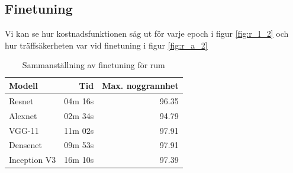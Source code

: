 \documentclass[]{kththesis}
\begin{document}
\subsection{Finetuning}
Vi kan se hur kostnadsfunktionen såg ut för varje epoch i figur \ref{fig:r_l_2} och hur träffsäkerheten var vid finetuning i figur \ref{fig:r_a_2}

\begin{table}
  \centering
  \begin{tabular}{|l|r|r|}
    Modell & Tid & Max. noggrannhet \\ 
    \hline
    Resnet       & 04m 16s & 96.35 \\
    Alexnet      & 02m 34s & 94.79 \\
    VGG-11       & 11m 02s & 97.91 \\
    Densenet     & 09m 53s & 97.91 \\
    Inception V3 & 16m 10s & 97.39 \\
  \end{tabular}
  \caption{Sammanställning av finetuning för rum}
\end{table}
\end{document}
